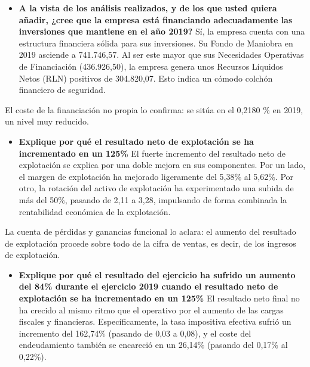 \documentclass[12pt]{book} %
\providecommand{\tightlist}{%
  \setlength{\itemsep}{0pt}\setlength{\parskip}{0pt}}
\begin{document}
\begin{itemize}
  de 33,94 días). Al ser el PMF positivo (30 días), la empresa requiere
  financiación adicional ajena a los proveedores para cubrir esos 30
  días de desfase operativo.
\item
  \textbf{A la vista de los análisis realizados, y de los que usted
  quiera añadir, ¿cree que la empresa está financiando adecuadamente las
  inversiones que mantiene en el año 2019?} Sí, la empresa cuenta con
  una estructura financiera sólida para sus inversiones. Su Fondo de
  Maniobra en 2019 asciende a 741.746,57. Al ser este mayor que sus
  Necesidades Operativas de Financiación (436.926,50), la empresa genera
  unos Recursos Líquidos Netos (RLN) positivos de 304.820,07. Esto
  indica un cómodo colchón financiero de seguridad.
\end{itemize}

El coste de la financiación no propia lo confirma: se sitúa en el 0,2180
\% en 2019, un nivel muy reducido.

\begin{itemize}
\tightlist
\item
  \textbf{Explique por qué el resultado neto de explotación se ha
  incrementado en un 125\%} El fuerte incremento del resultado neto de
  explotación se explica por una doble mejora en sus componentes. Por un
  lado, el margen de explotación ha mejorado ligeramente del 5,38\% al
  5,62\%. Por otro, la rotación del activo de explotación ha
  experimentado una subida de más del 50\%, pasando de 2,11 a 3,28,
  impulsando de forma combinada la rentabilidad económica de la
  explotación.
\end{itemize}

La cuenta de pérdidas y ganancias funcional lo aclara: el aumento del
resultado de explotación procede sobre todo de la cifra de ventas, es
decir, de los ingresos de explotación.

\begin{itemize}
\tightlist
\item
  \textbf{Explique por qué el resultado del ejercicio ha sufrido un
  aumento del 84\% durante el ejercicio 2019 cuando el resultado neto de
  explotación se ha incrementado en un 125\%} El resultado neto final no
  ha crecido al mismo ritmo que el operativo por el aumento de las
  cargas fiscales y financieras. Específicamente, la tasa impositiva
  efectiva sufrió un incremento del 162,74\% (pasando de 0,03 a 0,08), y
  el coste del endeudamiento también se encareció en un 26,14\% (pasando
  del 0,17\% al 0,22\%).
\end{itemize}
\end{document}
